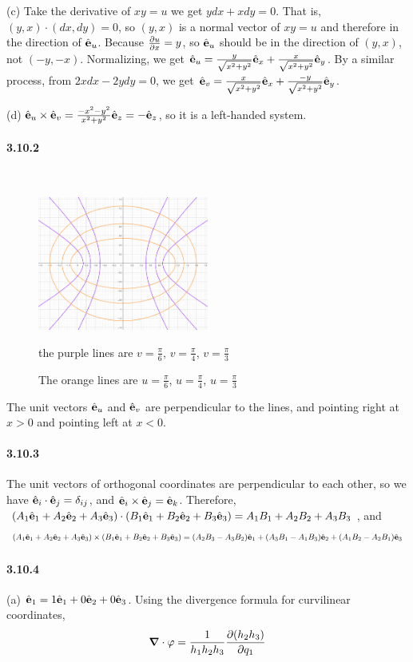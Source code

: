 \documentclass[a4paper]{article}
\begin{document}
(c) Take the derivative of $xy=u$ we get $ydx+xdy=0$. That is, $(y,x)\cdot(dx,dy)=0$, so $(y,x)$ is a normal vector of $xy=u$ and therefore in the direction of $\hat{\mathbf{e}}_u$. Because $\frac{\partial u}{\partial x}=y$, so $\hat{\mathbf{e}}_u$ should be in the direction of $(y,x)$, not $(-y,-x)$. Normalizing, we get $\hat{\mathbf{e}}_u=\frac{y}{\sqrt{x^2+y^2}}\hat{\mathbf{e}}_x+\frac{x}{\sqrt{x^2+y^2}}\hat{\mathbf{e}}_y$. By a similar process, from $2xdx-2ydy=0$, we get $\hat{\mathbf{e}}_v=\frac{x}{\sqrt{x^2+y^2}}\hat{\mathbf{e}}_x+\frac{-y}{\sqrt{x^2+y^2}}\hat{\mathbf{e}}_y$.

(d) $\hat{\mathbf{e}}_u\times\hat{\mathbf{e}}_v=\frac{-x^2-y^2}{x^2+y^2}\hat{\mathbf{e}}_z=-\hat{\mathbf{e}}_z$, so it is a left-handed system.

\paragraph{3.10.2}

\,

\begin{figure}[h]
    \centering
    \includegraphics[width=0.5\textwidth]{C.PNG}
    \caption{The orange lines are $u=\frac{\pi}{6}$, $u=\frac{\pi}{4}$, $u=\frac{\pi}{3}$}the purple lines are $v=\frac{\pi}{6}$, $v=\frac{\pi}{4}$, $v=\frac{\pi}{3}$
    \label{fig:C}
\end{figure}

The unit vectors $\hat{\mathbf{e}}_u$ and $\hat{\mathbf{e}}_v$ are perpendicular to the lines, and pointing right at $x>0$ and pointing left at $x<0$. 

\paragraph{3.10.3}
The unit vectors of orthogonal coordinates are perpendicular to each other, so we have $\hat{\mathbf{e}}_i\cdot\hat{\mathbf{e}}_j=\delta_{ij}$, and $\hat{\mathbf{e}}_i\times\hat{\mathbf{e}}_j=\hat{\mathbf{e}}_k$. Therefore, $(A_1\hat{\mathbf{e}}_1+A_2\hat{\mathbf{e}}_2+A_3\hat{\mathbf{e}}_3)\cdot(B_1\hat{\mathbf{e}}_1+B_2\hat{\mathbf{e}}_2+B_3\hat{\mathbf{e}}_3)=A_1B_1+A_2B_2+A_3B_3$, and \[(A_1\hat{\mathbf{e}}_1+A_2\hat{\mathbf{e}}_2+A_3\hat{\mathbf{e}}_3)\times(B_1\hat{\mathbf{e}}_1+B_2\hat{\mathbf{e}}_2+B_3\hat{\mathbf{e}}_3)=(A_2B_3-A_3B_2)\hat{\mathbf{e}}_1+(A_3B_1-A_1B_3)\hat{\mathbf{e}}_2+(A_1B_2-A_2B_1)\hat{\mathbf{e}}_3\]

\paragraph{3.10.4}
(a) $\hat{\mathbf{e}}_1=1\hat{\mathbf{e}}_1+0\hat{\mathbf{e}}_2+0\hat{\mathbf{e}}_3$. Using the divergence formula for curvilinear coordinates, \[\boldsymbol{\nabla}\cdot\varphi=\frac{1}{h_1h_2h_3}\frac{\partial(h_2h_3)}{\partial q_1}\]
\end{document}
